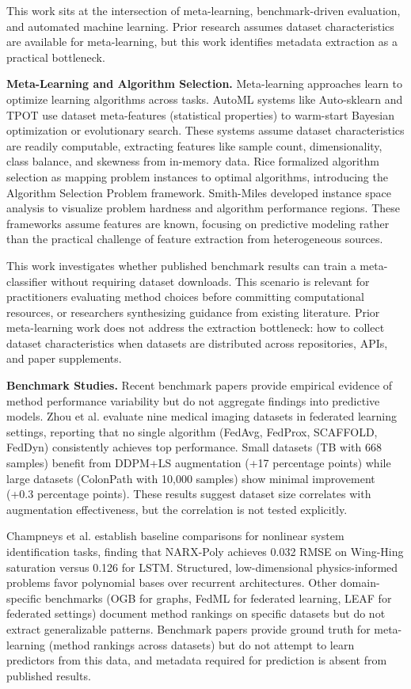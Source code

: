 
This work sits at the intersection of meta-learning, benchmark-driven evaluation, and automated machine learning. Prior research assumes dataset characteristics are available for meta-learning, but this work identifies metadata extraction as a practical bottleneck.

\textbf{Meta-Learning and Algorithm Selection.} Meta-learning approaches learn to optimize learning algorithms across tasks. AutoML systems like Auto-sklearn and TPOT use dataset meta-features (statistical properties) to warm-start Bayesian optimization or evolutionary search. These systems assume dataset characteristics are readily computable, extracting features like sample count, dimensionality, class balance, and skewness from in-memory data. Rice formalized algorithm selection as mapping problem instances to optimal algorithms, introducing the Algorithm Selection Problem framework. Smith-Miles developed instance space analysis to visualize problem hardness and algorithm performance regions. These frameworks assume features are known, focusing on predictive modeling rather than the practical challenge of feature extraction from heterogeneous sources.

This work investigates whether published benchmark results can train a meta-classifier without requiring dataset downloads. This scenario is relevant for practitioners evaluating method choices before committing computational resources, or researchers synthesizing guidance from existing literature. Prior meta-learning work does not address the extraction bottleneck: how to collect dataset characteristics when datasets are distributed across repositories, APIs, and paper supplements.

\textbf{Benchmark Studies.} Recent benchmark papers provide empirical evidence of method performance variability but do not aggregate findings into predictive models. Zhou et al. evaluate nine medical imaging datasets in federated learning settings, reporting that no single algorithm (FedAvg, FedProx, SCAFFOLD, FedDyn) consistently achieves top performance. Small datasets (TB with 668 samples) benefit from DDPM+LS augmentation (+17 percentage points) while large datasets (ColonPath with 10,000 samples) show minimal improvement (+0.3 percentage points). These results suggest dataset size correlates with augmentation effectiveness, but the correlation is not tested explicitly.

Champneys et al. establish baseline comparisons for nonlinear system identification tasks, finding that NARX-Poly achieves 0.032 RMSE on Wing-Hing saturation versus 0.126 for LSTM. Structured, low-dimensional physics-informed problems favor polynomial bases over recurrent architectures. Other domain-specific benchmarks (OGB for graphs, FedML for federated learning, LEAF for federated settings) document method rankings on specific datasets but do not extract generalizable patterns. Benchmark papers provide ground truth for meta-learning (method rankings across datasets) but do not attempt to learn predictors from this data, and metadata required for prediction is absent from published results.


